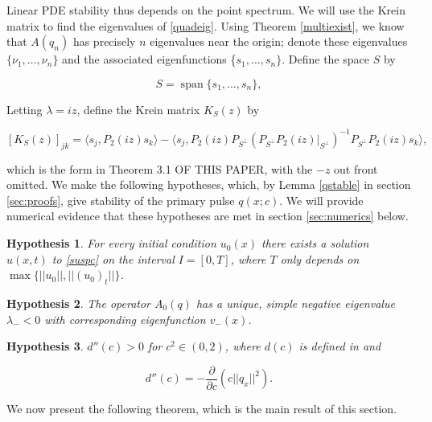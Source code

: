 \documentclass[12pt]{article}
\DeclareMathOperator{\spn}{span}
\newtheorem{hypothesis}{Hypothesis}
\begin{document}
Linear PDE stability thus depends on the point spectrum. We will use the Krein matrix to find the eigenvalues of \eqref{quadeig}. Using Theorem \ref{multiexist}, we know that $A(q_n)$ has precisely $n$ eigenvalues near the origin; denote these eigenvalues $\{\nu_1, \dots, \nu_n\}$ and the associated eigenfunctions \{$s_1, \dots, s_n\}$. Define the space $S$ by

\begin{equation}\label{defS}
S = \spn\{s_1, \dots, s_n \},
\end{equation}

Letting $\lambda = iz$, define the Krein matrix $K_S(z)$ by

\begin{equation}\label{Kreinmatrix}
[K_S(z)]_{jk} = 
\langle s_j , P_2(iz)s_k\rangle 
- \langle s_j , P_2(iz) P_{S^{\perp}} (P_{S^{\perp}} P_2(iz)|_{S^{\perp}} )^{-1} P_{S^{\perp}} P_2(iz) s_k \rangle,
\end{equation}

which is the form in Theorem 3.1 OF THIS PAPER, with the $-z$ out front omitted. We make the following hypotheses, which, by Lemma \ref{qstable} in section \ref{sec:proofs}, give stability of the primary pulse $q(x; c)$. We will provide numerical evidence that these hypotheses are met in section \ref{sec:numerics} below.

\begin{hypothesis}\label{PDEexisthyp}
For every initial condition $u_0(x)$ there exists a solution $u(x, t)$ to \eqref{suspc} on the interval $I = [0, T]$, where $T$ only depends on $\max{ \{ ||u_0||, ||(u_0)_t|| \} }$.
\end{hypothesis}

\begin{hypothesis}\label{A0neg}
The operator $A_0(q)$ has a unique, simple negative eigenvalue $\lambda_- < 0$ with corresponding eigenfunction $v_-(x)$.
\end{hypothesis}

\begin{hypothesis}\label{dccpos}
$d''(c) > 0$ for $c^2 \in (0, 2)$, where $d(c)$ is defined in \cite[Equation (2.16)]{Grillakis1987} and 

\begin{equation}\label{dcc}
d''(c) = -\frac{\partial}{\partial c} \left( c ||q_x||^2 \right).
\end{equation}
\end{hypothesis}

We now present the following theorem, which is the main result of this section.
\end{document}
